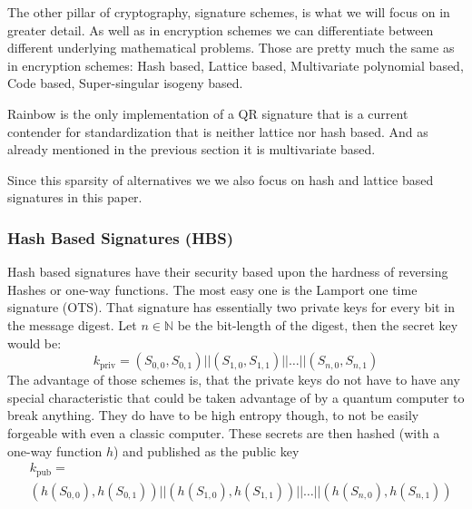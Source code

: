 \documentclass[conference]{IEEEtran}
\begin{document}
The other pillar of cryptography, signature schemes, is what we will focus on in greater detail.
As well as in encryption schemes we can differentiate between different underlying mathematical problems. Those are pretty much the same as in encryption schemes: 
Hash based,
Lattice based,
Multivariate polynomial based,
Code based,
Super-singular isogeny based.\cite{QR_sigs}

Rainbow is the only implementation of a QR signature that is a current contender for standardization that is neither lattice nor hash based.
And as already mentioned in the previous section it is multivariate based.

Since this sparsity of alternatives we we also focus on hash and lattice based signatures in this paper.

\subsubsection{Hash Based Signatures (HBS)}\label{HBS}
Hash based signatures have their security based upon the hardness of reversing Hashes or one-way functions.
The most easy one is the Lamport one time signature (OTS).\cite{QR_algs} 
That signature has essentially two private keys for every bit in the message digest. 
Let $n \in \mathbb{N}$ be the bit-length of the digest, then the secret key would be: \[k_\text{priv}= (S_{0,0},S_{0,1}) || (S_{1,0},S_{1,1})|| \dots || (S_{n,0},S_{n,1})\]
The advantage of those schemes is, that the private keys do not have to have any special characteristic that could be taken advantage of by a quantum computer to break anything.
They do have to be high entropy though, to not be easily forgeable with even a classic computer. 
These secrets are then hashed (with a one-way function $h$) and published as the public key \begin{align*}
    &k_\text{pub}= \\ &(h(S_{0,0}),h(S_{0,1})) || (h(S_{1,0}),h(S_{1,1}))|| \dots || (h(S_{n,0}),h(S_{n,1}))
\end{align*}
\end{document}
